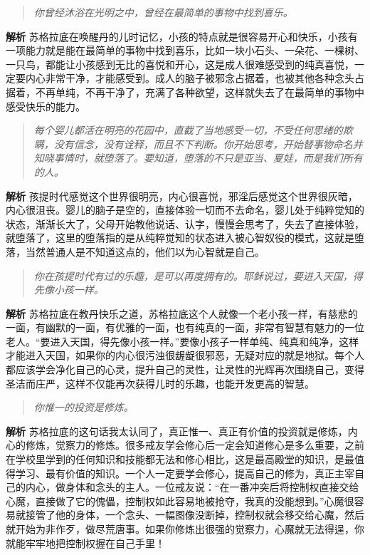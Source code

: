 \begin{quote}\it
    你曾经沐浴在光明之中，曾经在最简单的事物中找到喜乐。
\end{quote}

\textbf{解析} 苏格拉底在唤醒丹的儿时记忆，小孩的特点就是很容易开心和快乐，小孩有一项能力就是能在最简单的事物中找到喜乐，比如一块小石头、一朵花、一棵树、一只鸟，都能让小孩感到无比的喜悦和开心，这是成人很难感受到的纯真喜悦，一定要内心非常干净，才能感受到。成人的脑子被邪念占据着，也被其他各种念头占据着，不再单纯，不再干净了，充满了各种欲望，这样就失去了在最简单的事物中感受快乐的能力。

\begin{quote}\it
    每个婴儿都活在明亮的花园中，直截了当地感受一切，不受任何思绪的欺瞒，没有信念，没有诠释，而且不下判断。你开始思考，开始替事物命名并知晓事情时，就堕落了。要知道，堕落的不只是亚当、夏娃，而是我们所有的人。
\end{quote}

\textbf{解析} 孩提时代感觉这个世界很明亮，内心很喜悦，邪淫后感觉这个世界很灰暗，内心很沮丧。婴儿的脑子是空的，直接体验一切而不去命名，婴儿处于纯粹觉知的状态，渐渐长大了，父母开始教他说话、认字，慢慢会思考了，失去了直接体验，就堕落了，这里的堕落指的是从纯粹觉知的状态进入被心智奴役的模式，这就是堕落，当然普通人是不知道这点的，他们以为心智就是自己。

\begin{quote}\it
    你在孩提时代有过的乐趣，是可以再度拥有的。耶稣说过，要进入天国，得先像小孩一样。
\end{quote}

\textbf{解析} 苏格拉底在教丹快乐之道，苏格拉底这个人就像一个老小孩一样，有慈悲的一面，有幽默的一面，有优雅的一面，也有纯真的一面，非常有智慧有魅力的一位老人。“要进入天国，得先像小孩一样。”要像小孩子一样单纯、纯真和纯净，这样才能进入天国，如果你的内心很污浊很龌龊很邪恶，无疑对应的就是地狱。每个人都应该学会净化自己的心灵，提升自己的灵性，让灵性的光辉再次围绕自己，变得圣洁而庄严，这样不仅能再次获得儿时的乐趣，也能开发更高的智慧。

\begin{quote}\it
    你惟一的投资是修炼。
\end{quote}

\textbf{解析} 苏格拉底的这句话我太认同了，真正惟一、真正有价值的投资就是修炼，内心的修炼，觉察力的修炼。很多戒友学会修心后一定会知道修心是多么重要，之前在学校里学到的任何知识和技能都无法和修心相比，这是最高殿堂的知识，是最值得学习、最有价值的知识。一个人一定要学会修心，提高自己的修为，真正主宰自己的内心，做身体和念头的主人。一位戒友说：“在一番冲突后将控制权直接交给心魔，直接做了它的傀儡，控制权如此容易地被抢夺，我真的没能想到。”心魔很容易就接管了他的身体，一个念头、一幅图像没断掉，控制权就会移交给心魔，然后就开始为非作歹，做尽荒唐事。如果你修炼出很强的觉察力，心魔就无法得逞，你就能牢牢地把控制权握在自己手里！

